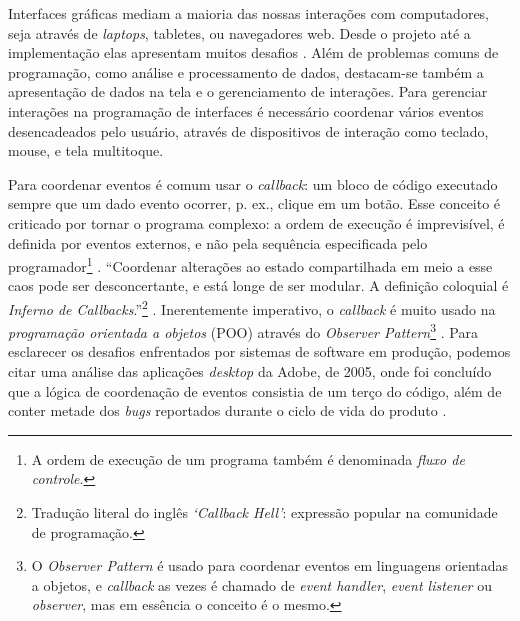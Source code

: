 Interfaces gráficas mediam a maioria das nossas interações com computadores,
seja através de \emph{laptops}, tabletes, ou navegadores web.
Desde o projeto até a implementação elas apresentam muitos desafios
\cite{myers1994}.
Além de problemas comuns de programação, como análise e processamento de dados,
destacam-se também a apresentação de dados na tela e o gerenciamento de
interações.
Para gerenciar interações na programação de interfaces é necessário coordenar
vários eventos desencadeados pelo usuário, através de dispositivos de interação
como teclado, mouse, e tela multitoque.

Para coordenar eventos é comum usar o \emph{callback}: um bloco de código executado
sempre que um dado evento ocorrer, p. ex., clique em um botão.
Esse conceito é criticado por tornar o programa complexo: a ordem de execução é
imprevisível, é definida por eventos externos, e não pela sequência especificada
pelo programador\footnote{A ordem de execução de um programa também é denominada \emph{fluxo
de controle}.} \cite{maier2010,edwards2009,fischer2007}.
“Coordenar alterações ao estado compartilhada em meio a esse caos pode ser
desconcertante, e está longe de ser modular. A definição coloquial é \emph{Inferno de
Callbacks}.”\footnote{Tradução literal do inglês \emph{‘Callback Hell’}: expressão
popular na comunidade de programação.} \cite[p. 2; tradução nossa]{edwards2009}.
Inerentemente imperativo, o \emph{callback} é muito usado na \emph{programação orientada a
objetos} (POO) através do \emph{Observer Pattern}\footnote{O \emph{Observer Pattern} é usado para coordenar eventos em
linguagens orientadas a objetos, e \emph{callback} as vezes é chamado de \emph{event
handler}, \emph{event listener} ou \emph{observer}, mas em essência o conceito é o mesmo.}
\cite{blackheath2016,maier2010}.
Para esclarecer os desafios enfrentados por sistemas de software em produção,
podemos citar uma análise das aplicações \emph{desktop} da Adobe, de 2005, onde foi
concluído que a lógica de coordenação de eventos consistia de um terço do
código, além de conter metade dos \emph{bugs} reportados durante o ciclo de vida do
produto \cite{jarvi2008}.

